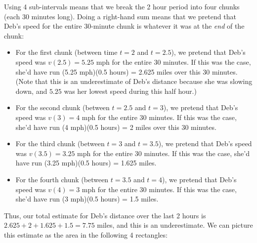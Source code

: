 \documentclass[main]{subfiles}
\begin{document}
\begin{enumerate}
\begin{solution}
\begin{itemize}
      Using 4 sub-intervals means that we break the 2 hour period into
      four chunks (each 30 minutes long).  Doing a right-hand sum means
      that we pretend that Deb's speed for the entire 30-minute chunk is
      whatever it was at the \emph{end} of the chunk:
      \begin{itemize}
      \item For the first chunk (between time $t = 2$ and $t = 2.5$), we
        pretend that Deb's speed was $v(2.5) = 5.25$ mph for the entire 30
        minutes.  If this was the case, she'd have run (5.25 mph)(0.5
        hours) = 2.625 miles over this 30 minutes.  (Note that this is an
        underestimate of Deb's distance because she was slowing down, and
        $5.25$ was her lowest speed during this half hour.)
      \item For the second chunk (between $t = 2.5$ and $t = 3$), we
        pretend that Deb's speed was $v(3) = 4$ mph for the entire 30
        minutes.  If this was the case, she'd have run (4 mph)(0.5 hours) =
        2 miles over this 30 minutes.
      \item For the third chunk (between $t = 3$ and $t = 3.5$), we
        pretend that Deb's speed was $v(3.5) = 3.25$ mph for the entire 30
        minutes.  If this was the case, she'd have run (3.25 mph)(0.5
        hours) = 1.625 miles.
      \item For the fourth chunk (between $t = 3.5$ and $t = 4$), we
        pretend that Deb's speed was $v(4) = 3$ mph for the entire 30
        minutes.  If this was the case, she'd have run (3 mph)(0.5 hours) =
        1.5 miles.
      \end{itemize}
      Thus, our total estimate for Deb's distance over the last 2 hours is
      $2.625 + 2 + 1.625 + 1.5 = 7.75$ miles, and this is an
      underestimate.  We can picture this estimate as the area in the
      following 4 rectangles:
      \begin{center}
      \end{center}      


\end{itemize}
\end{solution}
\end{enumerate}
\end{document}
